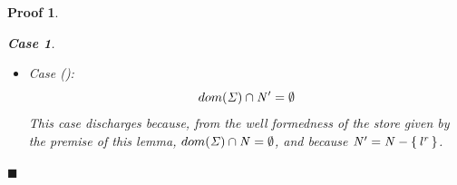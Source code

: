 \documentclass[showabstract,showacknowledgments,showpreface,showdedication]{iuphd}
\newtheorem*{bcase}{Case}
\theoremstyle{nonumberplain}
\newtheorem{nproof}{Proof}
\begin{document}
\begin{nproof}
\begin{bcase}
\begin{itemize}
\begin{itemize}
\begin{align*}
      \end{align*}
      Of the requirements pertaining to this judgement, the only one potentially
      affected by the new environment $\NENV'$ is requirement
      .
      The specific obligation therein is to establish that 
      \begin{align*}
      ((\reg \mapsto \locreg{\loc}{\reg}) \in \AENV \wedge 
    \, (\locreg{\loc}{\reg} \mapsto \concreteloc{\reg}{\ind_s}{}) \in \MENV \wedge \locreg{\loc}{\reg} \not \in \NENV' \wedge
    \, \ewitness{\TYP}{\concreteloc{\reg}{\ind_s}{}}{\STOR}{\concreteloc{\reg}{\ind_e}{}}) \Rightarrow \\
          \ind_e > \allocptr{\reg}{\STOR}.
          \end{align*}
      The reason the change to environment $\NENV'$ might affect
      the above is because, if all the conjuncts above hold, then
      it remains to establish that $\ind_e > \allocptr{\reg}{\STOR}$
      holds.
      However, it turns out that the fourth conjunct above does not
      hold, i.e., there is no such end witness in the store $\STOR$,
      thus relieving the obligation to establish $\ind_e > \allocptr{\reg}{\STOR}$.
      The reason the end witness does not exist is yielded by
      the well formedness of the store given by the premise of this
      lemma, in particular requirement
      .
      That is, by inversion on \tapp{}, it is the case that
      \begin{align*}
      (\reg \mapsto \locreg{\loc}{\reg}) \in \AENV \wedge \locreg{\loc}{\reg} \in \NENV.
      \end{align*}
      Therefore, requirement 
      implies that
      \begin{align*}
      \ind_s > \allocptr{\reg}{\STOR}.
      \end{align*}
      As such, given that the store $\STOR$ remains unchanged
      and the above, it is straightforward to show that the end witness
      starting at $\ind_s$ cannot exist, thereby discharging this case.
      \end{itemize}
      \item
      Case ():
      \begin{displaymath}
      dom(\mathit{\Sigma}) \cap \mathit{N}' = \emptyset
      \end{displaymath}
      This case discharges because,
      from the well formedness of the store given by the
      premise of this lemma, $dom(\mathit{\Sigma}) \cap \mathit{N} = \emptyset$,
      and because $\mathit{N}' = \mathit{N} - \{ \, {\mathit{l}}^{\mathit{r}} \,\}$.
    \end{itemize}
  \end{bcase}

$\blacksquare$  

\end{nproof}
\end{document}

